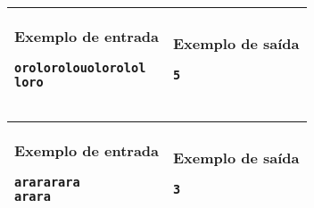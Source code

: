 \begin{table}[!h]
\centering
\begin{tabular}{|l|l|}
\hline
\begin{minipage}[t]{3in}
\textbf{Exemplo de entrada}
\begin{verbatim}
orolorolouolorolol
loro
\end{verbatim}
\vspace{1mm}
\end{minipage}
&
\begin{minipage}[t]{3in}
\textbf{Exemplo de saída}
\begin{verbatim}
5
\end{verbatim}
\vspace{1mm}
\end{minipage} \\
\hline
\end{tabular}
\end{table}


\begin{table}[!h]
\centering
\begin{tabular}{|l|l|}
\hline
\begin{minipage}[t]{3in}
\textbf{Exemplo de entrada}
\begin{verbatim}
arararara
arara
\end{verbatim}
\vspace{1mm}
\end{minipage}
&
\begin{minipage}[t]{3in}
\textbf{Exemplo de saída}
\begin{verbatim}
3
\end{verbatim}
\vspace{1mm}
\end{minipage} \\
\hline
\end{tabular}
\end{table}
